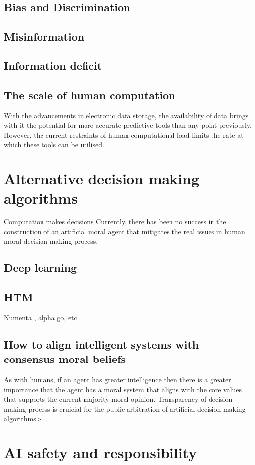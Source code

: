 \subsection{Bias and Discrimination}
\subsection{Misinformation}
\subsection{Information  deficit}
\subsection{The scale of human computation}
With the advancements in electronic data storage, the availability of data brings with it the potential for more accurate predictive tools than any point previously.
However, the current restraints of human computational load limits the rate at which these tools can be utilised.

\section{Alternative decision making algorithms}
Computation makes decisions
Currently, there has been no success in the construction of an artificial moral agent that mitigates the real issues in human moral decision making process.
\subsection{Deep learning}
\subsection{HTM}
Numenta \cite{numentahome}, alpha go, etc
\subsection{How to align intelligent systems with consensus moral beliefs}
As with humans, if an agent has greater intelligence then there is a greater importance that the agent has a moral system that aligns with the core values that supports the current majority moral opinion.
Transparency of decision making process is cruicial for the public arbitration of artificial decision making algorithms>

\section{AI safety and responsibility}
